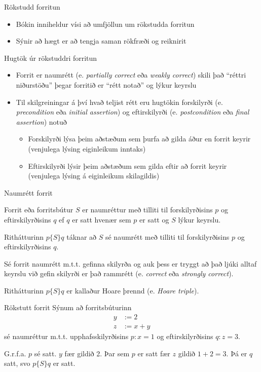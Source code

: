 \documentclass[handout]{beamer}
\begin{document}
\begin{frame}{Rökstudd forritun}
\begin{itemize}
 \item Bókin inniheldur vísi að umfjöllun um rökstudda forritun
 \item Sýnir að hægt er að tengja saman rökfræði og reiknirit
\end{itemize}
\end{frame}

\begin{frame}{Hugtök úr rökstuddri forritun}
\begin{itemize}
 \item Forrit er naumrétt (e. \emph{partially correct} eða \emph{weakly correct}) skili það ``réttri niðurstöðu'' þegar forritið er ``rétt notað'' og lýkur keyrslu
 \item Til skilgreiningar á því hvað teljist rétt eru hugtökin forskilyrði (e. \emph{precondition} eða \emph{initial assertion}) og eftirskilyrði (e. \emph{postcondition} eða \emph{final assertion}) notuð
 \begin{itemize}
  \item Forskilyrði lýsa þeim aðstæðum sem þurfa að gilda áður en forrit keyrir (venjulega lýsing eiginleikum inntaks)
  \item Eftirskilyrði lýsir þeim aðstæðum sem gilda eftir að forrit keyrir (venjulega lýsing á eiginleikum skilagildis)
 \end{itemize}
\end{itemize}
\end{frame}

\begin{frame}{Naumrétt forrit}
\begin{tcolorbox}[title=Naumrétt forrit]
Forrit eða forritsbútur $S$ er naumréttur með tilliti til forskilyrðisins $p$ og eftirskilyrðisins $q$ ef $q$ er satt hvenær sem $p$ er satt og $S$ lýkur keyrslu.

Rithátturinn $p\{S\}q$ táknar að $S$ sé naumrétt með tilliti til forskilyrðisins $p$ og eftirskilyrðisins $q$.
\end{tcolorbox}
Sé forrit naumrétt m.t.t. gefinna skilyrða og auk þess er tryggt að það ljúki alltaf keyrslu við gefin skilyrði er það rammrétt (e. \emph{correct} eða \emph{strongly correct}).

Rithátturinn $p\{S\}q$ er kallaður Hoare þrennd (e. \emph{Hoare triple}).
\end{frame}

\begin{frame}{Rökstutt forrit}
Sýnum að forritsbúturinn
\begin{align*}
y &:= 2\\
z &:= x + y
\end{align*}
sé naumréttur m.t.t. upphafsskilyrðisins $p: x = 1$ og eftirskilyrðisins $q: z = 3$. \pause

G.r.f.a. $p$ sé satt. $y$ fær gildið 2. Þar sem $p$ er satt fær $z$ gildið $1+2 = 3$. Þá er $q$ satt, svo $p\{S\}q$ er satt.
\end{frame}
\end{document}
